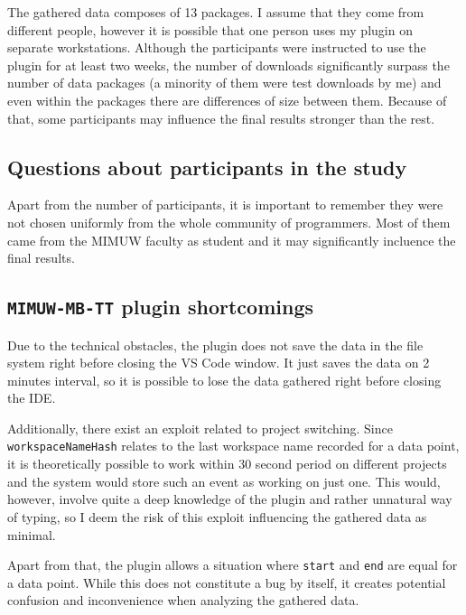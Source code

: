 The gathered data composes of 13 packages. I assume that they come from different people, however it is possible that one person uses my plugin on separate workstations. Although the participants were instructed to use the plugin for at least two weeks, the number of downloads significantly surpass the number of data packages (a minority of them were test downloads by me) and even within the packages there are differences of size between them. Because of that, some participants may influence the final results stronger than the rest.

\subsection{Questions about participants in the study}

Apart from the number of participants, it is important to remember they were not chosen uniformly from the whole community of programmers. Most of them came from the MIMUW faculty as student and it may significantly incluence the final results.

\subsection{\texttt{MIMUW-MB-TT} plugin shortcomings}

Due to the technical obstacles, the plugin does not save the data in the file system right before closing the VS Code window. It just saves the data on 2 minutes interval, so it is possible to lose the data gathered right before closing the IDE.

Additionally, there exist an exploit related to project switching. Since \texttt{workspaceNameHash} relates to the last workspace name recorded for a data point, it is theoretically possible to work within 30 second period on different projects and the system would store such an event as working on just one. This would, however, involve quite a deep knowledge of the plugin and rather unnatural way of typing, so I deem the risk of this exploit influencing the gathered data as minimal.

Apart from that, the plugin allows a situation where \texttt{start} and \texttt{end} are equal for a data point. While this does not constitute a bug by itself, it creates potential confusion and inconvenience when analyzing the gathered data.
